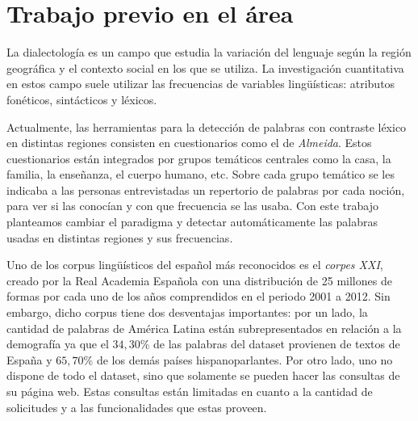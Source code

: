 





\section{Trabajo previo en el área}
La dialectología es un campo que estudia la variación del lenguaje según la región geográfica y el contexto social en los que se utiliza. La investigación cuantitativa en estos campo suele utilizar las frecuencias de variables lingüísticas: atributos fonéticos, sintácticos y léxicos.


Actualmente, las herramientas para la detección de palabras con contraste léxico en distintas regiones
consisten en cuestionarios como el de \emph{Almeida}\cite{almeida1995variacion}.  Estos cuestionarios están integrados por grupos temáticos centrales como la casa, la familia, la enseñanza, el cuerpo humano, etc. Sobre cada grupo temático se les indicaba a las personas entrevistadas un repertorio de palabras por cada noción, para ver si las conocían y con que frecuencia se las usaba. 
Con este trabajo planteamos cambiar el paradigma y detectar automáticamente las palabras usadas en distintas regiones y sus frecuencias.

Uno de los corpus lingüísticos del español más reconocidos es el \emph{corpes XXI}\cite{espanolabanco}, creado por la Real Academia Española con una distribución de 25 millones de formas por cada uno de los años comprendidos en el periodo 2001 
a 2012. Sin embargo, dicho corpus tiene dos desventajas importantes: por un
lado, la cantidad de palabras de América Latina están subrepresentados en relación a la demografía ya que el $34,30$\% de las palabras del dataset provienen de textos de España y $65,70$\% de los demás países hispanoparlantes. Por otro lado, uno no dispone de todo el dataset, sino que solamente se pueden hacer las consultas de su página web. Estas consultas están limitadas en cuanto a la cantidad de solicitudes y a las funcionalidades que estas proveen.

